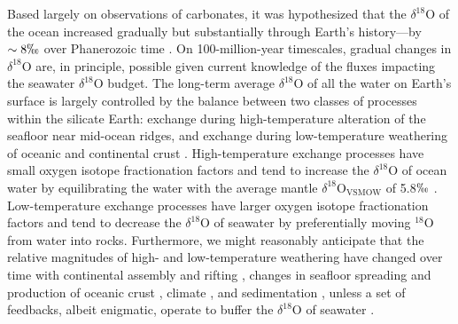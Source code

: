 \documentclass[preprint, authoryear]{elsarticle}
\begin{document}
Based largely on observations of carbonates, it was hypothesized that the $\delta^{18}$O of the ocean increased gradually but substantially through Earth's history---by $\sim8\permil$ over Phanerozoic time \citep{Jaffres2007, Veizer1999}. On 100-million-year timescales, gradual changes in $\delta^{18}$O are, in principle, possible given current knowledge of the fluxes impacting the seawater $\delta^{18}$O budget. The long-term average $\delta^{18}$O of all the water on Earth's surface is largely controlled by the balance between two classes of processes within the silicate Earth: exchange during high-temperature alteration of the seafloor near mid-ocean ridges, and exchange during low-temperature weathering of oceanic and continental crust \citep{Muehlenbachs1998}. High-temperature exchange processes have small oxygen isotope fractionation factors and tend to increase the $\delta^{18}$O of ocean water by equilibrating the water with the average mantle $\delta^{18}$O$_{\text{VSMOW}}$ of 5.8$\permil$ \citep{Muehlenbachs1998}. Low-temperature exchange processes have larger oxygen isotope fractionation factors and tend to decrease the $\delta^{18}$O of seawater by preferentially moving $^{18}$O from water into rocks. Furthermore, we might reasonably anticipate that the relative magnitudes of high- and low-temperature weathering have changed over time with continental assembly and rifting \citep{Collins2003}, changes in seafloor spreading and production of oceanic crust \citep{Muller2008, Fornari1995}, climate \citep{Frakes2005}, and sedimentation \citep{Molnar2004}, unless a set of feedbacks, albeit enigmatic, operate to buffer the $\delta^{18}$O of seawater \citep{Gregory1981, Gregory1991, Muehlenbachs1976, Muehlenbachs1998, Jaffres2007}.  
\end{document}
